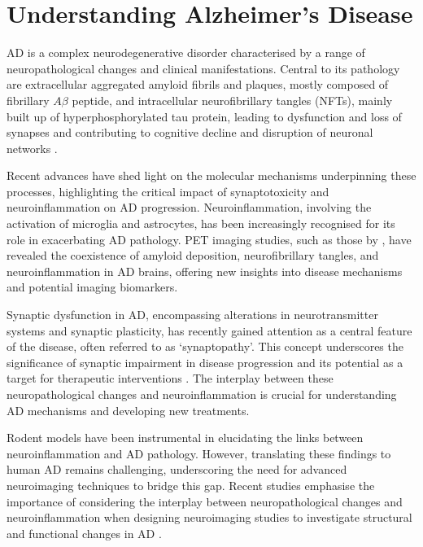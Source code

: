\documentclass[10pt]{article}
\begin{document}
\begin{sloppypar}
  \section{Understanding Alzheimer’s Disease}
  \label{sec:alzheimers-disease}

  AD is a complex neurodegenerative disorder characterised by a range of neuropathological changes and clinical manifestations. Central to its pathology are extracellular aggregated amyloid fibrils and plaques, mostly composed of fibrillary $A\beta$ peptide, and intracellular neurofibrillary tangles (NFTs), mainly built up of hyperphosphorylated tau protein, leading to dysfunction and loss of synapses and contributing to cognitive decline and disruption of neuronal networks \citep{heneka_neuroinflammation_2015,cai_magnetic_2020}.

  Recent advances have shed light on the molecular mechanisms underpinning these processes, highlighting the critical impact of synaptotoxicity and neuroinflammation on AD progression. Neuroinflammation, involving the activation of microglia and astrocytes, has been increasingly recognised for its role in exacerbating AD pathology. PET imaging studies, such as those by \cite{zhou_pet_2021}, have revealed the coexistence of amyloid deposition, neurofibrillary tangles, and neuroinflammation in AD brains, offering new insights into disease mechanisms and potential imaging biomarkers.

  Synaptic dysfunction in AD, encompassing alterations in neurotransmitter systems and synaptic plasticity, has recently gained attention as a central feature of the disease, often referred to as ‘synaptopathy’. This concept underscores the significance of synaptic impairment in disease progression and its potential as a target for therapeutic interventions \citep{meftah_alzheimers_2023}. The interplay between these neuropathological changes and neuroinflammation is crucial for understanding AD mechanisms and developing new treatments.

  Rodent models have been instrumental in elucidating the links between neuroinflammation and AD pathology. However, translating these findings to human AD remains challenging, underscoring the need for advanced neuroimaging techniques to bridge this gap. Recent studies emphasise the importance of considering the interplay between neuropathological changes and neuroinflammation when designing neuroimaging studies to investigate structural and functional changes in AD \citep{nazem_rodent_2015}.


\end{sloppypar}
\end{document}
